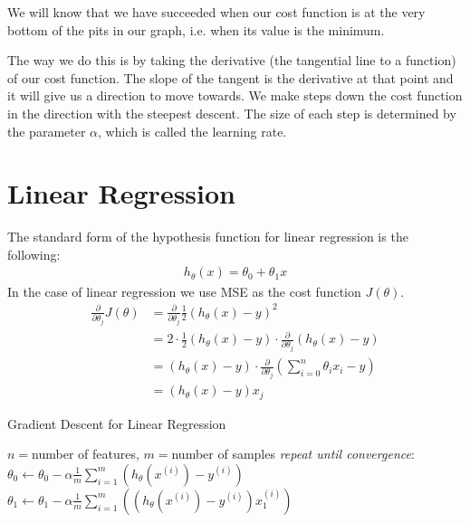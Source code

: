 \documentclass{article}
\begin{document}
            We will know that we have succeeded when our cost function is at the very bottom of the pits in our graph, i.e. when its value is the minimum. 
            
            The way we do this is by taking the derivative (the tangential line to a function) of our cost function. 
            The slope of the tangent is the derivative at that point and it will give us a direction to move towards.
            We make steps down the cost function in the direction with the steepest descent. 
            The size of each step is determined by the parameter $\alpha$, which is called the learning rate.
            
    \section{Linear Regression}
        
        The standard form of the hypothesis function for linear regression is the following:
        \begin{align*}
            h_{\theta}(x) = \theta_0 + \theta_1x
        \end{align*}
        In the case of linear regression we use MSE as the cost function $J(\theta)$.
        \begin{align*}
            \frac{\partial}{\partial\theta_j}J(\theta) &= \frac{\partial}{\partial\theta_j}\frac{1}{2}(h_{\theta}(x)-y)^2 \\
            &= 2\cdot\frac{1}{2}(h_{\theta}(x)-y)\cdot\frac{\partial}{\partial\theta_j}(h_{\theta}(x)-y) \\
            &= (h_{\theta}(x)-y)\cdot\frac{\partial}{\partial\theta_j}\left(\sum_{i=0}^{n}\theta_ix_i-y\right) \\
            &= (h_{\theta}(x)-y)x_j
        \end{align*}
        
        \begin{algorithm}
            \caption{Gradient Descent for Linear Regression}
            \begin{algorithmic}
                \STATE $n = $number of features, $m = $number of samples
                \STATE \emph{repeat until convergence}:
                \STATE \hspace{12pt}$\theta_0 \gets \theta_0 - \alpha\frac{1}{m}\sum_{i=1}^{m}(h_{\theta}(x^{(i)})-y^{(i)})$
                \STATE \hspace{12pt}$\theta_1 \gets \theta_1 - \alpha\frac{1}{m}\sum_{i=1}^{m}((h_{\theta}(x^{(i)})-y^{(i)})x_1^{(i)})$
            \end{algorithmic}
        \end{algorithm}
        
\end{document}
